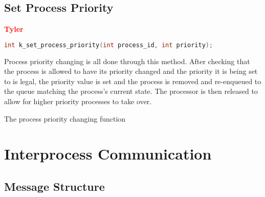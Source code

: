 \documentclass[12pt]{report}
\begin{document}
\subsection{Set Process Priority}

\textcolor{red}{\textbf{Tyler}} \\
\begin{minipage}{\textwidth}
\begin{lstlisting}[language=C, frame=single]
int k_set_process_priority(int process_id, int priority);
\end{lstlisting}
\end{minipage}

Process priority changing is all done through this method. After checking that the process is allowed to have its priority changed and the priority it is being set to is legal, the priority value is set and the process is removed and re-enqueued to the queue matching the process's current state. The processor is then released to allow for higher priority processes to take over.

\begin{algorithm}
  \caption{The process priority changing function}
  \begin{algorithmic}[1]
		\EndIf
    \EndProcedure
  \end{algorithmic}
\end{algorithm}

\pagebreak


\section{Interprocess Communication}

\subsection{Message Structure}
\end{document}
